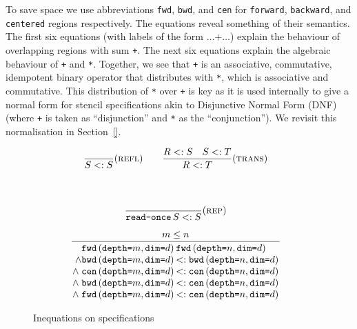 \documentclass[9pt]{sigplanconf}
\theoremstyle{definition}
\newcommand{\term}[1]{\texttt{#1}}
\newcommand{\stenFwdS}[2]{\term{fwd} \, (\term{depth=}#1,
  \term{dim=}#2)}
\newcommand{\stenBwdS}[2]{\term{bwd} \, (\term{depth=}#1,
  \term{dim=}#2)}
\newcommand{\stenCenS}[2]{\term{cen} \, (\term{depth=}#1,
  \term{dim=}#2)}
\begin{document}
To save space we use abbreviations 
\term{fwd}, \term{bwd}, and \term{cen} for \term{forward},
\term{backward}, and \term{centered} regions respectively.  The
equations reveal something of their semantics.  The first six
equations (with labels of the form $\ldots \texttt{+} \ldots$) 
explain the behaviour of overlapping regions with sum
\term{+}. The next six equations explain the algebraic behaviour of
\term{+} and \term{*}.  Together, we see that \term{+} is an
associative, commutative, idempotent binary operator that distributes
with \term{*}, which is associative and commutative. This distribution
of \term{*} over \term{+} is key as it is used internally to give a
normal form for stencil specifications akin to Disjunctive Normal Form
(DNF) (where \term{+} is taken as ``disjunction'' and \term{*} as the
``conjunction''). We revisit this normalisation in Section~\ref{}.

\begin{figure}[t]
\begin{minipage}{0.88\linewidth}
\begin{align*}
\hspace{-0.7em}
\begin{array}{c}
\dfrac{}{S <: S}(\textsc{refl}) \qquad \dfrac{R <: S \quad S <: T}{R <:
  T}(\textsc{trans}) \\[1.5em]
\\[1.5em]
\dfrac{}{\texttt{read-once} \, S <: S}(\textsc{rep})
\\[1.5em]
\setlength{\arraycolsep}{0.1em}
\dfrac{\hspace{3em} m \leq n \hspace{3em}}
{\begin{array}{rl}
\stenFwdS{m}{d} & \stenFwdS{n}{d}
\\
\wedge \stenBwdS{m}{d} & <: \stenBwdS{n}{d}
\\
\wedge \; \stenCenS{m}{d} & <: \stenCenS{n}{d}
\\
\wedge \; \stenBwdS{m}{d} & <: \stenCenS{n}{d} \\
\wedge \; \stenFwdS{m}{d} & <: \stenCenS{n}{d} \\
\end{array}}
\end{array}
\end{align*}
\end{minipage}
\caption{Inequations on specifications}
\label{fig:inequations}
\end{figure}
\end{document}
